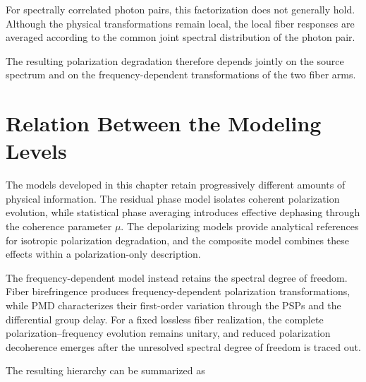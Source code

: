 For spectrally correlated photon pairs, this factorization does not generally
hold. Although the physical transformations remain local, the local fiber
responses are averaged according to the common joint spectral distribution of the
photon pair.

The resulting polarization degradation therefore depends jointly on the source
spectrum and on the frequency-dependent transformations of the two fiber arms.


\section{Relation Between the Modeling Levels}
\label{sec:relation_between_modeling_levels}

The models developed in this chapter retain progressively different amounts of
physical information. The residual phase model isolates coherent polarization
evolution, while statistical phase averaging introduces effective dephasing
through the coherence parameter \(\mu\). The depolarizing models provide
analytical references for isotropic polarization degradation, and the composite
model combines these effects within a polarization-only description.

The frequency-dependent model instead retains the spectral degree of freedom.
Fiber birefringence produces frequency-dependent polarization transformations,
while PMD characterizes their first-order variation through the PSPs and the
differential group delay. For a fixed lossless fiber realization, the complete
polarization--frequency evolution remains unitary, and reduced polarization
decoherence emerges after the unresolved spectral degree of freedom is traced
out.

The resulting hierarchy can be summarized as

